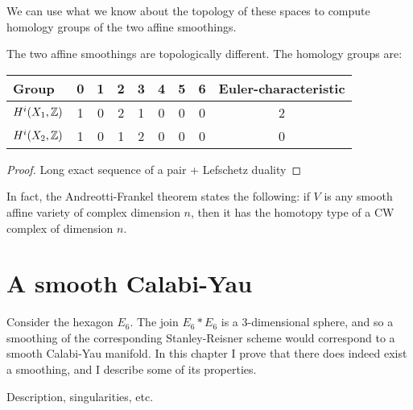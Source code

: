 \documentclass[]{uiophd}
\begin{document}
We can use what we know about the topology of these spaces to compute homology groups of the two affine smoothings.

\begin{thm}
The two affine smoothings are topologically different. The homology groups are:

\begin{tabular}{ l || c | c | c | c | c | c | c || c }
 Group & 0 & 1 & 2 & 3 & 4 & 5 & 6 & Euler-characteristic \\
\hline
$H^i(X_1,\mathbb{Z})$ & 1 & 0 & 2 & 1 & 0 & 0 & 0 & 2 \\
$H^i(X_2,\mathbb{Z})$ & 1 & 0 & 1 & 2 & 0 & 0 & 0  & 0
\end{tabular}
\end{thm}

\begin{proof}
Long exact sequence of a pair + Lefschetz duality 
\end{proof}

\begin{remark}
In fact, the Andreotti-Frankel theorem \cite{andreotti_affinecw} states the following: if $V$ is any smooth affine variety of complex dimension $n$, then it has the homotopy type of a CW complex of dimension $n$.
\end{remark}


\chapter{A smooth Calabi-Yau}

Consider the hexagon $E_6$. The join $E_6 \ast E_6$ is a $3$-dimensional sphere, and so a smoothing of the corresponding Stanley-Reisner scheme would correspond to a smooth Calabi-Yau manifold. In this chapter I prove that there does indeed exist a smoothing, and I describe some of its properties.

Description, singularities, etc.




\end{document}
